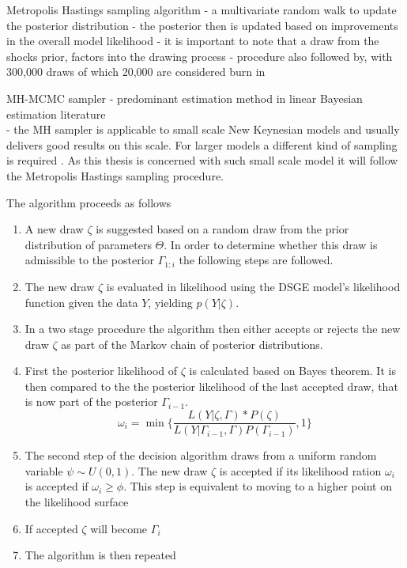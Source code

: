 \documentclass[11pt,a4paper,english]{article} %
\begin{document}
	
	Metropolis Hastings sampling algorithm
	- a multivariate random walk to update the posterior distribution
	- the posterior then is updated based on improvements in the overall model likelihood
	- it is important to note that a draw from the shocks prior, factors into the drawing process
	- procedure also followed by, with 300,000 draws of which 20,000 are considered burn in \cite{chin_bayesian_2019}
	
	MH-MCMC sampler
	- predominant estimation method in linear Bayesian estimation literature \cite{guerron-quintana_bayesian_2013}\\
	- the MH sampler is applicable to small scale New Keynesian models and usually delivers good results on this scale. For larger models a different kind of sampling is required \cite{herbst_bayesian_2014}. As this thesis is concerned with such small scale model it will follow the Metropolis Hastings sampling procedure.
	
	
	The algorithm proceeds as follows \cite{herbst_bayesian_2014}\\
	
	\begin{enumerate}
		\item A new draw $\zeta$ is suggested based on a random draw from the prior distribution of parameters $\Theta$. In order to determine whether this draw is admissible to the posterior $\Gamma_{1:i}$ the following steps are followed.
		
		\item The new draw $\zeta$ is evaluated in likelihood using the DSGE model's likelihood function given the data $Y$, yielding $p(Y | \zeta)$. 
				
		\item In a two stage procedure the algorithm then either accepts or rejects the new draw $\zeta$ as part of the Markov chain of posterior distributions. 
		
		\item First the posterior likelihood of $\zeta$ is calculated based on Bayes theorem. It is then compared to the the posterior likelihood of the last accepted draw, that is now part of the posterior $\Gamma_{i-1}$. 
		\[
			\omega_i = \min \{\frac{L(Y| \zeta, \Gamma) * P(\zeta)}{L(Y| \Gamma_{i-1}, \Gamma) P(\Gamma_{i-1})}, 1 \}
		\]

		\item The second step of the decision algorithm draws from a uniform random variable $\psi \sim U(0, 1)$. The new draw $\zeta$ is accepted if its likelihood ration $\omega_i$ is accepted if $\omega_i \geq \phi$. This step is equivalent to moving to a higher point on the likelihood surface \cite{herbst_bayesian_2014}
		
		\item If accepted $\zeta$ will become $\Gamma_i$
		
		\item The algorithm is then repeated
		
	\end{enumerate}
\end{document}

